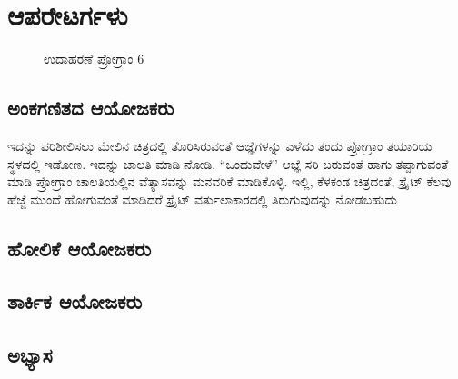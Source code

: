 \chapter{ಆಪರೇಟರ್ಗಳು}
\begin{figure}[h]
\begin{Scratch}[1]
\beginbox{}
\end{Scratch}
\caption{ಉದಾಹರಣೆ ಪ್ರೋಗ್ರಾಂ 6}
\end{figure}

\section{ಅಂಕಗಣಿತದ ಆಯೋಜಕರು}
ಇದನ್ನು ಪರಿಶೀಲಿಸಲು ಮೇಲಿನ ಚಿತ್ರದಲ್ಲಿ ತೊರಿಸಿರುವಂತೆ ಆಜ್ಞೆಗಳನ್ನು ಎಳೆದು ತಂದು ಪ್ರೋಗ್ರಾಂ ತಯಾರಿಯ ಸ್ಥಳದಲ್ಲಿ ಇಡೋಣ. ಇದನ್ನು ಚಾಲತಿ ಮಾಡಿ ನೋಡಿ. “ಒಂದುವೇಳೆ” ಆಜ್ಞೆ ಸರಿ ಬರುವಂತೆ ಹಾಗು ತಪ್ಪಾಗುವಂತೆ ಮಾಡಿ ಪ್ರೋಗ್ರಾಂ ಚಾಲತಿಯಲ್ಲಿನ ವೆತ್ಯಾಸವನ್ನು ಮನವರಿಕೆ ಮಾಡಿಕೊಳ್ಳಿ. ಇಲ್ಲಿ, ಕೆಳಕಂಡ ಚಿತ್ರದಂತೆ, ಸ್ಪ್ರೈಟ್ ಕೆಲವು ಹೆಜ್ಜೆ ಮುಂದೆ ಹೋಗುವಂತೆ ಮಾಡಿದರೆ ಸ್ಪ್ರೈಟ್ ವರ್ತುಲಾಕಾರದಲ್ಲಿ ತಿರುಗುವುದನ್ನು ನೋಡಬಹುದು

\section{ಹೋಲಿಕೆ ಆಯೋಜಕರು}


\section{ತಾರ್ಕಿಕ ಆಯೋಜಕರು}

\section{ಅಭ್ಯಾಸ }